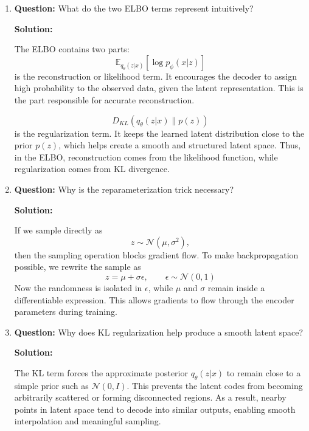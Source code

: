 \documentclass{article}
\begin{document}
\begin{enumerate}
Expand \(p_\phi(x,z)=p_\phi(x|z)p(z)\):
\[
\log p_\phi(x)
\ge
\mathbb{E}_{q_\theta(z|x)}[\log p_\phi(x|z)]
+
\mathbb{E}_{q_\theta(z|x)}[\log p(z)-\log q_\theta(z|x)]
\]

Thus,
\[
\mathcal{L}_{ELBO}
=
\mathbb{E}_{q_\theta(z|x)}[\log p_\phi(x|z)]
-
D_{KL}(q_\theta(z|x)\|p(z))
\]

This is called the Evidence Lower Bound because it is a lower bound on \(\log p_\phi(x)\).

\item \textbf{Question:}
What do the two ELBO terms represent intuitively?

\textbf{Solution:}

The ELBO contains two parts:
\[
\mathbb{E}_{q_\theta(z|x)}[\log p_\phi(x|z)]
\]
is the reconstruction or likelihood term. It encourages the decoder to assign high probability to the observed data, given the latent representation. This is the part responsible for accurate reconstruction.

\[
D_{KL}(q_\theta(z|x)\|p(z))
\]
is the regularization term. It keeps the learned latent distribution close to the prior \(p(z)\), which helps create a smooth and structured latent space. Thus, in the ELBO, reconstruction comes from the likelihood function, while regularization comes from KL divergence.

\item \textbf{Question:}
Why is the reparameterization trick necessary?

\textbf{Solution:}

If we sample directly as
\[
z \sim \mathcal{N}(\mu,\sigma^2),
\]
then the sampling operation blocks gradient flow. To make backpropagation possible, we rewrite the sample as
\[
z = \mu + \sigma \epsilon,
\qquad \epsilon \sim \mathcal{N}(0,1)
\]
Now the randomness is isolated in \(\epsilon\), while \(\mu\) and \(\sigma\) remain inside a differentiable expression. This allows gradients to flow through the encoder parameters during training.

\item \textbf{Question:}
Why does KL regularization help produce a smooth latent space?

\textbf{Solution:}

The KL term forces the approximate posterior \(q_\theta(z|x)\) to remain close to a simple prior such as \(\mathcal{N}(0,I)\). This prevents the latent codes from becoming arbitrarily scattered or forming disconnected regions. As a result, nearby points in latent space tend to decode into similar outputs, enabling smooth interpolation and meaningful sampling.

\end{enumerate}
\end{document}

